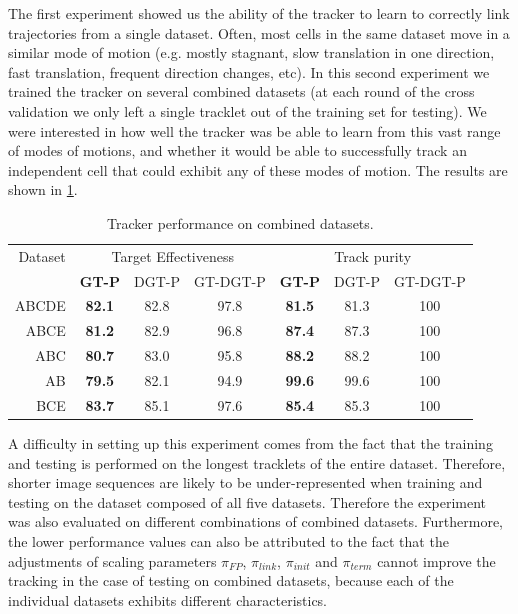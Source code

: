 		The first experiment showed us the ability of the tracker to learn to correctly link trajectories from a single dataset. Often, most cells in the same dataset move in a similar mode of motion (e.g. mostly stagnant, slow translation in one direction, fast translation, frequent direction changes, etc). In this second experiment we trained the tracker on several combined datasets (at each round of the cross validation we only left a single tracklet out of the training set for testing). We were interested in how well the tracker was be able to learn from this vast range of modes of motions, and whether it would be able to successfully track an independent cell that could exhibit any of these modes of motion. The results are shown in \cref{tab:results_tracker_combined}.
		
		\begin{table}[h]
			\centering
			\begin{tabular}{r*{3}{c}*{3}{c}}
				Dataset & \multicolumn{3}{c}{Target Effectiveness} & \multicolumn{3}{c}{Track purity} \\
				        & \textbf{GT-P} & DGT-P &     GT-DGT-P     & \textbf{GT-P} & DGT-P & GT-DGT-P \\
			\hline
				  ABCDE & \textbf{82.1} & 82.8  &       97.8       & \textbf{81.5} & 81.3  &   100    \\
				   ABCE & \textbf{81.2} & 82.9  &       96.8       & \textbf{87.4} & 87.3  &   100    \\
				    ABC & \textbf{80.7} & 83.0  &       95.8       & \textbf{88.2} & 88.2  &   100    \\
				     AB & \textbf{79.5} & 82.1  &       94.9       & \textbf{99.6} & 99.6  &   100    \\
				    BCE & \textbf{83.7} & 85.1  &       97.6       & \textbf{85.4} & 85.3  &   100
			\end{tabular} 
			\caption{Tracker performance on combined datasets.}
			\label{tab:results_tracker_combined}
		\end{table}

		A difficulty in setting up this experiment comes from the fact that the training and testing is performed on the longest tracklets of the entire dataset. Therefore, shorter image sequences are likely to be under-represented when training and testing on the dataset composed of all five datasets. Therefore the experiment was also evaluated on different combinations of combined datasets. Furthermore, the lower performance values can also be attributed to the fact that the adjustments of scaling parameters $\pi_{FP}$, $\pi_{link}$, $\pi_{init}$ and $\pi_{term}$ cannot improve the tracking in the case of testing on combined datasets, because each of the individual datasets exhibits different characteristics.

